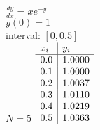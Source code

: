 {
$\displaystyle \frac{dy}{dx} = xe^{-y}$\\
$y(0)=1$\\
interval: $[0,0.5]$\\
$N=5$
}
{
	$\begin{array}[b]{l | l}
		x_i & y_i    \\ \hline
		0.0 & 1.0000 \\
		0.1 & 1.0000 \\
		0.2 & 1.0037 \\
		0.3 & 1.0110 \\
		0.4 & 1.0219 \\
		0.5 & 1.0363
	\end{array}$
}